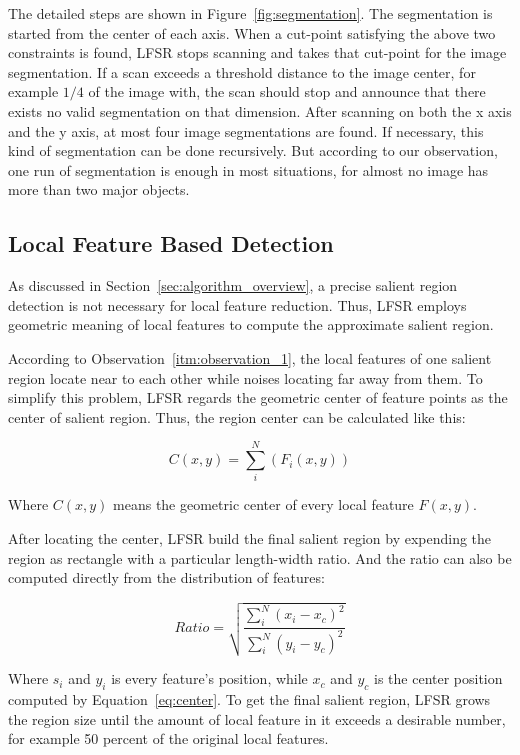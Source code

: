 The detailed steps are shown in Figure~\ref{fig:segmentation}. The segmentation is started from the center of each axis. When a cut-point satisfying the above two constraints is found, LFSR stops scanning and takes that cut-point for the image segmentation. If a scan exceeds a threshold distance to the image center, for example $1/4$ of the image with, the scan should stop and announce that there exists no valid segmentation on that dimension. After scanning on both the x axis and the y axis, at most four image segmentations are found. If necessary, this kind of segmentation can be done recursively. But according to our observation, one run of segmentation is enough in most situations, for almost no image has more than two major objects.

\subsection{Local Feature Based Detection}
\label{sec:algorithm_detection}

As discussed in Section~\ref{sec:algorithm_overview}, a precise salient region detection is not necessary for local feature reduction. Thus, LFSR employs geometric meaning of local features to compute the approximate salient region.

According to Observation~\ref{itm:observation_1}, the local features of one salient region locate near to each other while noises locating far away from them. To simplify this problem, LFSR regards the geometric center of feature points as the center of salient region. Thus, the region center can be calculated like this:

{\begin{equation} \label{eq:center}
C(x, y) = \sum_{i}^{N}\left({F}_{i}(x, y) \right)
\end{equation}}

Where $C(x, y)$ means the geometric center of every local feature $F(x, y)$.

After locating the center, LFSR build the final salient region by expending the region as rectangle with a particular length-width ratio. And the ratio can also be computed directly from the distribution of features:

{\begin{equation} \label{eq:ratio}
Ratio = \sqrt{\frac{\sum_{i}^{N}\left ( x_{i}-x_{c} \right )^{2}}{\sum_{i}^{N}\left ( y_{i}-y_{c} \right )^{2}}}
\end{equation}}

Where $s_{i}$ and $y_{i}$ is every feature's position, while $x_{c}$ and $y_{c}$ is the center position computed by Equation~\ref{eq:center}. To get the final salient region, LFSR grows the region size until the amount of local feature in it exceeds a desirable number, for example 50 percent of the original local features.

